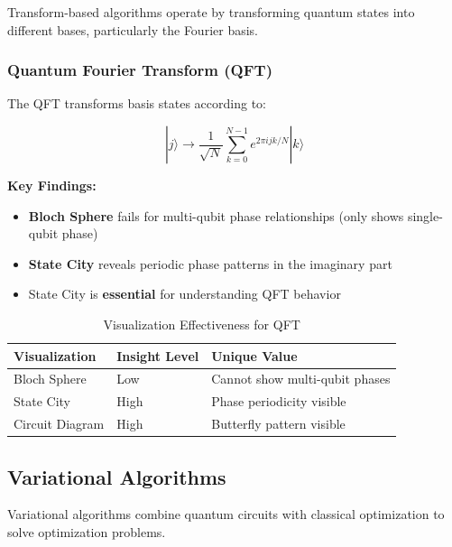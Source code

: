 \documentclass[12pt,a4paper]{article}
\begin{document}
Transform-based algorithms operate by transforming quantum states into different bases, particularly the Fourier basis.

\subsubsection{Quantum Fourier Transform (QFT)}

The QFT transforms basis states according to:

\begin{equation}
	|j\rangle \rightarrow \frac{1}{\sqrt{N}} \sum_{k=0}^{N-1} e^{2\pi ijk/N} |k\rangle
\end{equation}

\textbf{Key Findings:}

\begin{itemize}
	\item \textbf{Bloch Sphere} fails for multi-qubit phase relationships (only shows single-qubit phase)
	\item \textbf{State City} reveals periodic phase patterns in the imaginary part
	\item State City is \textbf{essential} for understanding QFT behavior
\end{itemize}

\begin{table}[h!]
	\centering
	\caption{Visualization Effectiveness for QFT}
	\label{tab:qft_visualization}
	\begin{tabular}{@{}lll@{}}
		\toprule
		\textbf{Visualization} & \textbf{Insight Level} & \textbf{Unique Value}          \\ \midrule
		Bloch Sphere           & Low                    & Cannot show multi-qubit phases \\
		State City             & High                   & Phase periodicity visible      \\
		Circuit Diagram        & High                   & Butterfly pattern visible      \\ \bottomrule
	\end{tabular}
\end{table}

\subsection{Variational Algorithms}

Variational algorithms combine quantum circuits with classical optimization to solve optimization problems.
\end{document}
